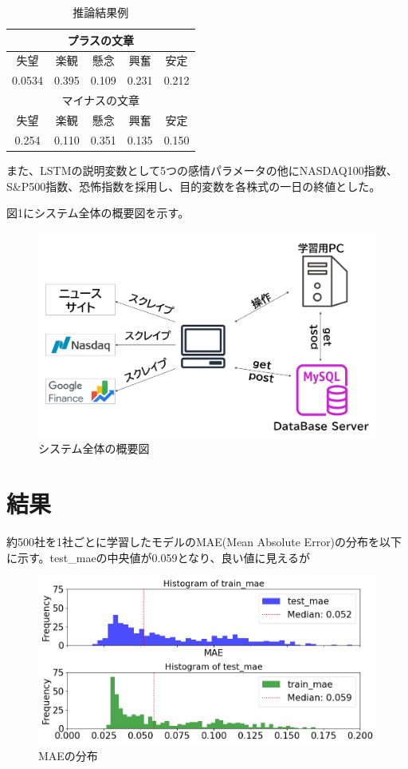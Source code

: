 \documentclass[a4paper, 10pt]{article}
\begin{document}
\begin{table}[htbp]
    \centering
    \caption{推論結果例}

    \begin{tabular}{|c|c|c|c|c|}\hline
        \multicolumn{5}{|c|}{プラスの文章} \\ \hline
        失望 & 楽観 & 懸念 & 興奮 & 安定 \\ \hline
        0.0534 & 0.395 & 0.109 & 0.231 & 0.212 \\ \hline
        \multicolumn{5}{|c|}{マイナスの文章} \\ \hline
        失望 & 楽観 & 懸念 & 興奮 & 安定 \\ \hline
        0.254 & 0.110 & 0.351 & 0.135 & 0.150 \\ \hline
    \end{tabular}

\end{table}

また、LSTMの説明変数として5つの感情パラメータの他にNASDAQ100指数、S\&P500指数、恐怖指数を採用し、目的変数を各株式の一日の終値とした。

図1にシステム全体の概要図を示す。

\begin{figure}[h]
    \centering
    \includegraphics[width=0.65\columnwidth]{./assets/system.png}
    \caption{システム全体の概要図}
\end{figure}



\section{結果}

約500社を1社ごとに学習したモデルのMAE(Mean Absolute Error)の分布を以下に示す。test\_maeの中央値が0.059となり、良い値に見えるが

\begin{figure}[h]
    \centering
    \includegraphics[width=0.9\columnwidth]{./assets/graph.png}
    \caption{MAEの分布}
\end{figure}
\end{document}
